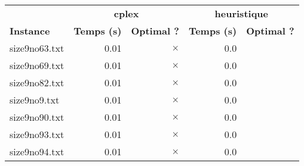 \documentclass{article}
\begin{document}
\newpage
\begin{center}
\renewcommand{\arraystretch}{1.4} 
 \begin{tabular}{lrrrr}
	\hline
 & \multicolumn{2}{c}{\textbf{cplex}} & \multicolumn{2}{c}{\textbf{heuristique}}\\
\textbf{Instance}  & \textbf{Temps (s)} & \textbf{Optimal ?}  & \textbf{Temps (s)} & \textbf{Optimal ?} \\\hline

size9no63.txt & 0.01 & 
$\times$
 & 0.0 & 
\\
size9no69.txt & 0.01 & 
$\times$
 & 0.0 & 
\\
size9no82.txt & 0.01 & 
$\times$
 & 0.0 & 
\\
size9no9.txt & 0.01 & 
$\times$
 & 0.0 & 
\\
size9no90.txt & 0.01 & 
$\times$
 & 0.0 & 
\\
size9no93.txt & 0.01 & 
$\times$
 & 0.0 & 
\\
size9no94.txt & 0.01 & 
$\times$
 & 0.0 & 
\\
\hline\end{tabular}
\end{center}
\end{document}
